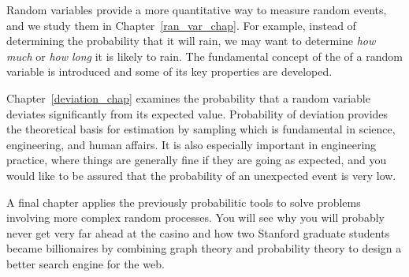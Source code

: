 Random variables provide a more quantitative way to measure random
events, and we study them in Chapter~\ref{ran_var_chap}.  For example,
instead of determining the probability that it will rain, we may want
to determine \emph{how much} or \emph{how long} it is likely to rain.
The fundamental concept of the  of a random
variable is introduced and some of its key properties are developed.

Chapter~\ref{deviation_chap} examines the probability that a random
variable deviates significantly from its expected value.  Probability
of deviation provides the theoretical basis for estimation by sampling
which is fundamental in science, engineering, and human affairs.  It
is also especially important in engineering practice, where things are
generally fine if they are going as expected, and you would like to be
assured that the probability of an unexpected event is very low.


A final chapter applies the previously probabilitic tools to solve
problems involving more complex random processes.  You will see why
you will probably never get very far ahead at the casino and how two
Stanford graduate students became billionaires by combining graph
theory and probability theory to design a better search engine for the
web.

\endinput
